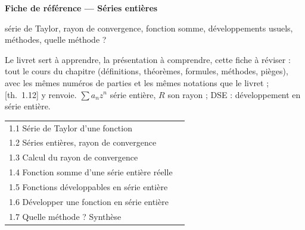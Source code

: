 \documentclass[a4paper,10pt]{article}
\newcommand{\livre}[1]{{\sffamily\scriptsize\color{Gris}[#1]}}
\begin{document}
\thispagestyle{empty}
\noindent\colorbox{Bleu}{\parbox{\dimexpr\linewidth-2\fboxsep}{\vspace{0.4em}
{\color{white}\sffamily\scriptsize{}}\par\smallskip
{\color{white}\sffamily\bfseries\LARGE Fiche de référence --- Séries entières}\par\smallskip
{\color{white!85!Bleu}\sffamily série de Taylor, rayon de convergence, fonction somme, développements usuels, méthodes, quelle méthode ?}\vspace{0.4em}}}

\vspace{0.6em}
{\small Le livret sert à apprendre, la présentation à comprendre, cette fiche à réviser : tout le cours du chapitre (définitions, théorèmes, formules, méthodes, pièges), avec les mêmes numéros de parties et les mêmes notations que le livret ; \livre{th.~1.12} y renvoie. $\sum a_nz^n$ série entière, $R$ son rayon ; DSE : développement en série entière.}

\vspace{0.4em}
{\small\sffamily\noindent\begin{tabular}{@{}p{0.6\linewidth}@{}}
1.1 Série de Taylor d'une fonction \dotfill\pageref{n11}\\
1.2 Séries entières, rayon de convergence \dotfill\pageref{n12}\\
1.3 Calcul du rayon de convergence \dotfill\pageref{n13}\\
1.4 Fonction somme d'une série entière réelle \dotfill\pageref{n14}\\
1.5 Fonctions développables en série entière \dotfill\pageref{n15}\\
1.6 Développer une fonction en série entière \dotfill\pageref{n16}\\
1.7 Quelle méthode ? Synthèse \dotfill\pageref{n17}\\
\end{tabular}}
\end{document}
